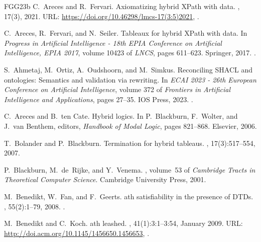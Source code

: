 \documentclass[10pt,a4paper]{amsart}
\theoremstyle{definition}
\theoremstyle{remark}
\begin{document}
\begin{thebibliography}{FGG{\etalchar{+}}23b}
C.~Areces and R.~Fervari.
\newblock Axiomatizing hybrid {XP}ath with data.
, 17(3), 2021.
\newblock URL: \url{https://doi.org/10.46298/lmcs-17(3:5)2021}, \href {https://doi.org/10.46298/LMCS-17(3:5)2021} {}.

C.~Areces, R.~Fervari, and N.~Seiler.
\newblock Tableaux for hybrid {XP}ath with data.
\newblock In {\em Progress in Artificial Intelligence - 18th {EPIA} Conference on Artificial Intelligence, {EPIA} 2017}, volume 10423 of {\em LNCS}, pages 611--623. Springer, 2017.
\newblock \href {https://doi.org/10.1007/978-3-319-65340-2\_50} {}.

S.~Ahmetaj, M.~Ortiz, A.~Oudshoorn, and M.~Simkus.
\newblock Reconciling {SHACL} and ontologies: Semantics and validation via rewriting.
\newblock In {\em {ECAI} 2023 - 26th European Conference on Artificial Intelligence}, volume 372 of {\em Frontiers in Artificial Intelligence and Applications}, pages 27--35. {IOS} Press, 2023.
\newblock \href {https://doi.org/10.3233/FAIA230250} {}.

C.~Areces and B.~ten Cate.
\newblock Hybrid logics.
\newblock In P.~Blackburn, F.~Wolter, and J.~van Benthem, editors, {\em Handbook of Modal Logic}, pages 821--868. Elsevier, 2006.

T.~Bolander and P.~Blackburn.
\newblock Termination for hybrid tableaus.
, 17(3):517--554, 2007.

P.~Blackburn, M.~de~Rijke, and Y.~Venema.
, volume~53 of {\em Cambridge Tracts in Theoretical Computer Science}.
\newblock Cambridge University Press, 2001.

M.~Benedikt, W.~Fan, and F.~Geerts.
ath satisfiability in the presence of {DTD}s.
, 55(2):1--79, 2008.
\newblock \href {https://doi.org/10.1145/1346330.1346333} {}.

M.~Benedikt and C.~Koch.
ath leashed.
, 41(1):3:1--3:54, January 2009.
\newblock URL: \url{http://doi.acm.org/10.1145/1456650.1456653}, \href {https://doi.org/10.1145/1456650.1456653} {}.


\end{thebibliography}
\end{document}
